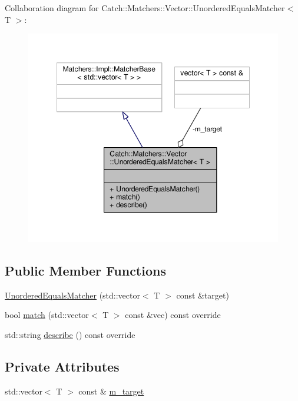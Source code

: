 Collaboration diagram for Catch\-:\-:Matchers\-:\-:Vector\-:\-:Unordered\-Equals\-Matcher$<$ T $>$\-:
\nopagebreak
\begin{figure}[H]
\begin{center}
\leavevmode
\includegraphics[width=348pt]{struct_catch_1_1_matchers_1_1_vector_1_1_unordered_equals_matcher__coll__graph}
\end{center}
\end{figure}
\subsection*{Public Member Functions}
\begin{DoxyCompactItemize}
\item 
\hyperlink{struct_catch_1_1_matchers_1_1_vector_1_1_unordered_equals_matcher_a525905639b2b15b52ddb0bf14bfa19da}{Unordered\-Equals\-Matcher} (std\-::vector$<$ T $>$ const \&target)
\item 
bool \hyperlink{struct_catch_1_1_matchers_1_1_vector_1_1_unordered_equals_matcher_a3ccdd9dd2cd8bdbb8bb121acbb9cb358}{match} (std\-::vector$<$ T $>$ const \&vec) const override
\item 
std\-::string \hyperlink{struct_catch_1_1_matchers_1_1_vector_1_1_unordered_equals_matcher_a7202d811200317abc58c844f663823df}{describe} () const override
\end{DoxyCompactItemize}
\subsection*{Private Attributes}
\begin{DoxyCompactItemize}
\item 
std\-::vector$<$ T $>$ const \& \hyperlink{struct_catch_1_1_matchers_1_1_vector_1_1_unordered_equals_matcher_aaa39871eb4034d4335214215dd693712}{m\-\_\-target}
\end{DoxyCompactItemize}


